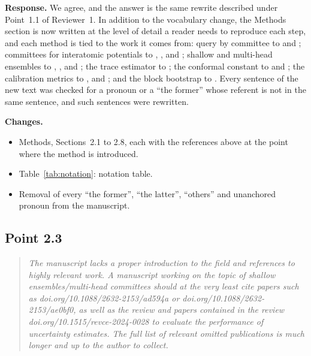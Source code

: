 \documentclass[11pt]{article}
\newcommand{\rpoint}[1]{\begin{quote}\itshape #1\end{quote}}
\newcommand{\response}{\medskip\noindent\textbf{Response.} }
\newcommand{\changes}{\medskip\noindent\textbf{Changes.}}
\begin{document}
\response
We agree, and the answer is the same rewrite described under Point~1.1 of
Reviewer~1. In addition to the vocabulary change, the Methods section is now
written at the level of detail a reader needs to reproduce each step, and
each method is tied to the work it comes from: query by committee to
\citet{seung1992query} and \citet{krogh1995neural}; committees for
interatomic potentials to \citet{artrith2012high}, \citet{gastegger2017machine},
\citet{schran2020committee} and \citet{imbalzano2021uncertainty}; shallow and
multi-head ensembles to \citet{kellner2024shallow},
\citet{vinchurkar2025gnn}, \citet{schafer2026shallow} and
\citet{beck2025committee}; the trace estimator to \citet{meyer2021hutchpp};
the conformal constant to \citet{vovk2005algorithmic} and
\citet{lei2018distribution}; the calibration metrics to
\citet{busk2021calibrated}, \citet{pernot2022long} and \citet{tran2020methods};
and the block bootstrap to \citet{kunsch1989jackknife}. Every sentence of the
new text was checked for a pronoun or a ``the former'' whose referent is not
in the same sentence, and such sentences were rewritten.

\changes
\begin{itemize}
\item Methods, Sections~2.1 to 2.8, each with the references above at the
  point where the method is introduced.
\item Table~\ref{tab:notation}: notation table.
\item Removal of every ``the former'', ``the latter'', ``others'' and
  unanchored pronoun from the manuscript.
\end{itemize}

\subsection*{Point 2.3}
\rpoint{The manuscript lacks a proper introduction to the field and
references to highly relevant work. A manuscript working on the topic of
shallow ensembles/multi-head committees should at the very least cite papers
such as doi.org/10.1088/2632-2153/ad594a or doi.org/10.1088/2632-2153/ae0bf0,
as well as the review and papers contained in the review
doi.org/10.1515/revce-2024-0028 to evaluate the performance of uncertainty
estimates. The full list of relevant omitted publications is much longer and
up to the author to collect.}
\end{document}
